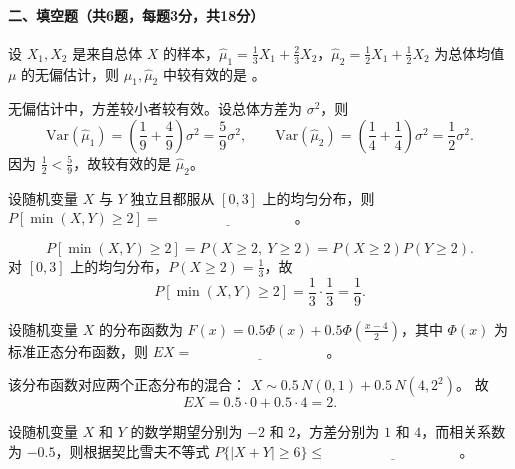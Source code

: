 \documentclass[lang=cn,11pt]{elegantbook}
\begin{document}
\paragraph*{二、填空题（共6题，每题3分，共18分）}
\begin{exercise}
\par
设 \(X_1,X_2\) 是来自总体 \(X\) 的样本，\(\hat{\mu}_1=\frac13X_1+\frac23X_2\)，\(\hat{\mu}_2=\frac12X_1+\frac12X_2\) 为总体均值 \(\mu\) 的无偏估计，则 \(\hat{\mu}_1,\hat{\mu}_2\) 中较有效的是 \underline{\hspace{4cm}}。
\end{exercise}

\begin{solution}
\par
无偏估计中，方差较小者较有效。设总体方差为 \(\sigma^2\)，则
\[
  \mathrm{Var}(\hat{\mu}_1)=\left(\frac19+\frac49\right)\sigma^2=\frac59\sigma^2,
  \qquad
  \mathrm{Var}(\hat{\mu}_2)=\left(\frac14+\frac14\right)\sigma^2=\frac12\sigma^2.
\]
因为 \(\frac12<\frac59\)，故较有效的是 \(\hat{\mu}_2\)。
\end{solution}
\begin{exercise}
\par
设随机变量 \(X\) 与 \(Y\) 独立且都服从 \([0,3]\) 上的均匀分布，则 \(P[\min(X,Y)\ge2]=\underline{\hspace{4cm}}\)。
\end{exercise}

\begin{solution}
\par
\[
  P[\min(X,Y)\ge2]=P(X\ge2,\ Y\ge2)=P(X\ge2)P(Y\ge2).
\]
对 \([0,3]\) 上的均匀分布，\(P(X\ge2)=\frac13\)，故
\[
  P[\min(X,Y)\ge2]=\frac13\cdot\frac13=\frac19.
\]
\end{solution}
\begin{exercise}
\par
设随机变量 \(X\) 的分布函数为 \(F(x)=0.5\Phi(x)+0.5\Phi\!\left(\frac{x-4}{2}\right)\)，其中 \(\Phi(x)\) 为标准正态分布函数，则 \(EX=\underline{\hspace{4cm}}\)。
\end{exercise}

\begin{solution}
\par
该分布函数对应两个正态分布的混合：
\(X\sim 0.5\,N(0,1)+0.5\,N(4,2^2)\)。
故
\[
  EX=0.5\cdot0+0.5\cdot4=2.
\]
\end{solution}
\begin{exercise}
\par
设随机变量 \(X\) 和 \(Y\) 的数学期望分别为 \(-2\) 和 \(2\)，方差分别为 \(1\) 和 \(4\)，而相关系数为 \(-0.5\)，则根据契比雪夫不等式 \(P\{|X+Y|\ge6\}\le\underline{\hspace{4cm}}\)。
\end{exercise}
\end{document}
